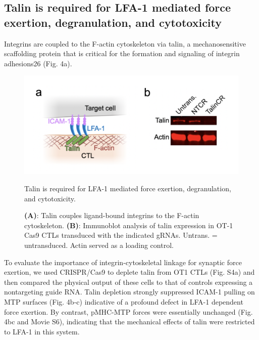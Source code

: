 \subsection{Talin is required for LFA-1 mediated force exertion, degranulation, and cytotoxicity}
Integrins are coupled to the F-actin cytoskeleton via talin, a mechanosensitive scaffolding protein that is critical for the formation and signaling of integrin adhesions26 (Fig. 4a).  

\begin{figure}[htbp]
	\centering
	\includegraphics[width=1.0\columnwidth]{../figures/chapter3/fig4model.png}
	\caption{Talin is required for LFA-1 mediated force exertion, degranulation, and
cytotoxicity.}
	\caption*{\textbf{(A)}: Talin couples ligand-bound integrins to the F-actin cytoskeleton. \textbf{(B)}: Immunoblot analysis of talin expression in OT-1 Cas9 CTLs transduced with the indicated gRNAs. Untrans. = untransduced. Actin served as a loading control.}
	\label{fig:fig4model}
\end{figure} 

To evaluate the importance of integrin-cytoskeletal linkage for synaptic force exertion, we used CRISPR/Cas9 to deplete talin from OT1 CTLs (Fig. S4a) and then compared the physical output of these cells to that of controls expressing a nontargeting guide RNA. Talin depletion strongly suppressed ICAM-1 pulling on MTP surfaces (Fig. 4b-c) indicative of a profound defect in LFA-1 dependent force exertion. By contrast, pMHC-MTP forces were essentially unchanged (Fig. 4bc and Movie S6), indicating that the mechanical effects of talin were restricted to LFA-1 in this system. 

